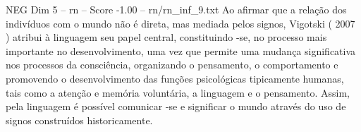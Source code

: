 \begin{textsample}{NEG Dim 5 – rn – Score -1.00 – rn/rn\_inf\_9.txt}
Ao afirmar que a relação dos indivíduos com o mundo não é direta, mas mediada pelos signos, Vigotski ( 2007 ) atribui à linguagem seu papel central, constituindo -se, no processo mais importante no desenvolvimento, uma vez que permite uma mudança significativa nos processos da consciência, organizando o pensamento, o comportamento e promovendo o desenvolvimento das funções psicológicas tipicamente humanas, tais como a atenção e memória voluntária, a linguagem e o pensamento.
Assim, pela linguagem é possível comunicar -se e significar o mundo através do uso de signos construídos historicamente.

\end{textsample}
